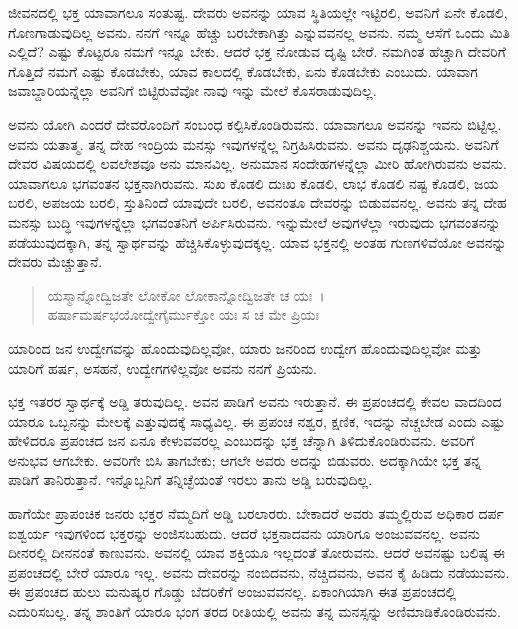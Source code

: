 ಜೀವನದಲ್ಲಿ ಭಕ್ತ ಯಾವಾಗಲೂ ಸಂತುಷ್ಟ. ದೇವರು ಅವನನ್ನು ಯಾವ ಸ್ಥಿತಿಯಲ್ಲೇ ಇಟ್ಟಿರಲಿ, ಅವನಿಗೆ ಏನೇ ಕೊಡಲಿ, ಗೊಣಗಾಡುವುದಿಲ್ಲ ಅವನು. ನನಗೆ ಇನ್ನೂ ಹೆಚ್ಚು ಬರಬೇಕಾಗಿತ್ತು ಎನ್ನುವವನಲ್ಲ ಅವನು. ನಮ್ಮ ಆಸೆಗೆ ಒಂದು ಮಿತಿ ಎಲ್ಲಿದೆ? ಎಷ್ಟು ಕೊಟ್ಟರೂ ನಮಗೆ ಇನ್ನೂ ಬೇಕು. ಆದರೆ ಭಕ್ತ ನೋಡುವ ದೃಷ್ಟಿ ಬೇರೆ. ನಮಗಿಂತ ಹೆಚ್ಚಾಗಿ ದೇವರಿಗೆ ಗೊತ್ತಿದೆ ನಮಗೆ ಎಷ್ಟು ಕೊಡಬೇಕು, ಯಾವ ಕಾಲದಲ್ಲಿ ಕೊಡಬೇಕು, ಏನು ಕೊಡಬೇಕು ಎಂಬುದು. ಯಾವಾಗ ಜವಾಬ್ದಾರಿಯನ್ನೆಲ್ಲಾ ಅವನಿಗೆ ಬಿಟ್ಟಿರುವೆವೋ ನಾವು ಇನ್ನು ಮೇಲೆ ಕೊಸರಾಡುವುದಿಲ್ಲ.

ಅವನು ಯೋಗಿ ಎಂದರೆ ದೇವರೊಂದಿಗೆ ಸಂಬಂಧ ಕಲ್ಪಿಸಿಕೊಂಡಿರುವನು. ಯಾವಾಗಲೂ ಅವನನ್ನು ಇವನು ಬಿಟ್ಟಿಲ್ಲ. ಅವನು ಯತಾತ್ಮ. ತನ್ನ ದೇಹ ಇಂದ್ರಿಯ ಮನಸ್ಸು ಇವುಗಳನ್ನೆಲ್ಲ ನಿಗ್ರಹಿಸಿರುವನು. ಅವನು ದೃಢನಿಶ್ಚಯನು. ಅವನಿಗೆ ದೇವರ ವಿಷಯದಲ್ಲಿ ಲವಲೇಶವೂ ಅನು ಮಾನವಿಲ್ಲ. ಅನುಮಾನ ಸಂದೇಹಗಳನ್ನೆಲ್ಲಾ ಮೀರಿ ಹೋಗಿರುವನು ಅವನು. ಯಾವಾಗಲೂ ಭಗವಂತನ ಭಕ್ತನಾಗಿರುವನು. ಸುಖ ಕೊಡಲಿ ದುಃಖ ಕೊಡಲಿ, ಲಾಭ ಕೊಡಲಿ ನಷ್ಟ ಕೊಡಲಿ, ಜಯ ಬರಲಿ, ಅಪಜಯ ಬರಲಿ, ಸ್ತುತಿನಿಂದೆ ಯಾವುದೇ ಬರಲಿ, ಅವನಂತೂ ದೇವರನ್ನು ಬಿಡುವವನಲ್ಲ. ಅವನು ತನ್ನ ದೇಹ ಮನಸ್ಸು ಬುದ್ಧಿ ಇವುಗಳನ್ನೆಲ್ಲಾ ಭಗವಂತನಿಗೆ ಅರ್ಪಿಸಿರುವನು. ಇನ್ನುಮೇಲೆ ಅವುಗಳೆಲ್ಲಾ ಇರುವುದು ಭಗವಂತನನ್ನು ಪಡೆಯುವುದಕ್ಕಾಗಿ, ತನ್ನ ಸ್ವಾರ್ಥವನ್ನು ಹೆಚ್ಚಿಸಿಕೊಳ್ಳುವುದಕ್ಕಲ್ಲ. ಯಾವ ಭಕ್ತನಲ್ಲಿ ಅಂತಹ ಗುಣಗಳಿವೆಯೋ ಅವನನ್ನು ದೇವರು ಮೆಚ್ಚುತ್ತಾನೆ.

\begin{verse}
ಯಸ್ಮಾನ್ನೋದ್ವಿಜತೇ ಲೋಕೋ ಲೋಕಾನ್ನೋದ್ವಿಜತೇ ಚ ಯಃ~।\\ಹರ್ಷಾಮರ್ಷಭಯೋದ್ವೇಗೈರ್ಮುಕ್ತೋ ಯಃ ಸ ಚ ಮೇ ಪ್ರಿಯಃ 
\end{verse}

{\small ಯಾರಿಂದ ಜನ ಉದ್ವೇಗವನ್ನು ಹೊಂದುವುದಿಲ್ಲವೋ, ಯಾರು ಜನರಿಂದ ಉದ್ವೇಗ ಹೊಂದುವುದಿಲ್ಲವೋ ಮತ್ತು ಯಾರಿಗೆ ಹರ್ಷ, ಅಸಹನೆ, ಉದ್ವೇಗಗಳಿಲ್ಲವೋ ಅವನು ನನಗೆ ಪ್ರಿಯನು.}

ಭಕ್ತ ಇತರರ ಸ್ವಾರ್ಥಕ್ಕೆ ಅಡ್ಡಿ ತರುವುದಿಲ್ಲ. ಅವನ ಪಾಡಿಗೆ ಅವನು ಇರುತ್ತಾನೆ. ಈ ಪ್ರಪಂಚದಲ್ಲಿ ಕೇವಲ ವಾದದಿಂದ ಯಾರೂ ಒಬ್ಬನನ್ನು ಮೇಲಕ್ಕೆ ಎತ್ತುವುದಕ್ಕೆ ಸಾಧ್ಯವಿಲ್ಲ. ಈ ಪ್ರಪಂಚ ನಶ್ವರ, ಕ್ಷಣಿಕ, ಇದನ್ನು ನೆಚ್ಚಬೇಡ ಎಂದು ಎಷ್ಟು ಹೇಳಿದರೂ ಪ್ರಪಂಚದ ಜನ ಏನೂ ಕೇಳುವವರಲ್ಲ ಎಂಬುದನ್ನು ಭಕ್ತ ಚೆನ್ನಾಗಿ ತಿಳಿದುಕೊಂಡಿರುವನು. ಅವರಿಗೆ ಅನುಭವ ಆಗಬೇಕು. ಅವರಿಗೇ ಬಿಸಿ ತಾಗಬೇಕು; ಆಗಲೇ ಅವರು ಅದನ್ನು ಬಿಡುವರು. ಅದಕ್ಕಾಗಿಯೇ ಭಕ್ತ ತನ್ನ ಪಾಡಿಗೆ ತಾನಿರುತ್ತಾನೆ. ಇನ್ನೊಬ್ಬನಿಗೆ ತನ್ನಿಚ್ಛೆಯಂತೆ ಇರಲು ತಾನು ಅಡ್ಡಿ ಬರುವುದಿಲ್ಲ.

ಹಾಗೆಯೇ ಪ್ರಾಪಂಚಿಕ ಜನರು ಭಕ್ತರ ನೆಮ್ಮದಿಗೆ ಅಡ್ಡಿ ಬರಲಾರರು. ಬೇಕಾದರೆ ಅವರು ತಮ್ಮಲ್ಲಿರುವ ಅಧಿಕಾರ ದರ್ಪ ಐಶ್ವರ್ಯ ಇವುಗಳಿಂದ ಭಕ್ತರನ್ನು ಅಂಜಿಸಬಹುದು. ಆದರೆ ಭಕ್ತನಾದವನು ಯಾರಿಗೂ ಅಂಜುವವನಲ್ಲ. ಅವನು ದೀನರಲ್ಲಿ ದೀನನಂತೆ ಕಾಣುವನು. ಅವನಲ್ಲಿ ಯಾವ ಶಕ್ತಿಯೂ ಇಲ್ಲದಂತೆ ತೋರುವನು. ಆದರೆ ಅವನಷ್ಟು ಬಲಿಷ್ಠ ಈ ಪ್ರಪಂಚದಲ್ಲಿ ಬೇರೆ ಯಾರೂ ಇಲ್ಲ. ಅವನು ದೇವರನ್ನು ನಂಬಿದವನು, ನೆಚ್ಚಿದವನು, ಅವನ ಕೈ ಹಿಡಿದು ನಡೆಯುವನು. ಈ ಪ್ರಪಂಚದ ಹುಲು ಮನುಷ್ಯರ ಗೊಡ್ಡು ಬೆದರಿಕೆಗೆ ಅಂಜುವವನಲ್ಲ. ಏಕಾಂಗಿಯಾಗಿ ಈತ ಪ್ರಪಂಚದಲ್ಲಿ ಎದುರಿಸಬಲ್ಲ. ತನ್ನ ಶಾಂತಿಗೆ ಯಾರೂ ಭಂಗ ತರದ ರೀತಿಯಲ್ಲಿ ಅವನು ತನ್ನ ಮನಸ್ಸನ್ನು ಅಣಿಮಾಡಿಕೊಂಡಿರುವನು.


